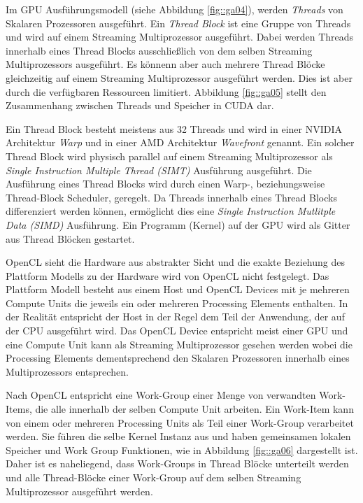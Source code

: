 Im GPU Ausführungsmodell (siehe Abbildung \ref{fig::ga04}), werden \emph{Threads} von Skalaren Prozessoren ausgeführt.
Ein \emph{Thread Block} ist eine Gruppe von Threads und wird auf einem Streaming Multiprozessor ausgeführt.
Dabei werden Threads innerhalb eines Thread Blocks ausschließlich von dem selben Streaming Multiprozessors ausgeführt.
Es könnenn aber auch mehrere Thread Blöcke gleichzeitig auf einem Streaming Multiprozessor ausgeführt werden.
Dies ist aber durch die verfügbaren Ressourcen limitiert.
Abbildung \ref{fig::ga05} stellt den Zusammenhang zwischen Threads und Speicher in CUDA dar.

Ein Thread Block besteht meistens aus 32 Threads und wird in einer NVIDIA Architektur \emph{Warp} und in einer AMD Architektur \emph{Wavefront} genannt.
Ein solcher Thread Block wird physisch parallel auf einem Streaming Multiprozessor als \emph{Single Instruction Multiple Thread (SIMT)} Ausführung ausgeführt.
Die Ausführung eines Thread Blocks wird durch einen Warp-, beziehungsweise Thread-Block Scheduler, geregelt.
Da Threads innerhalb eines Thread Blocks differenziert werden können, ermöglicht dies eine \emph{Single Instruction Mutlitple Data (SIMD)} Ausführung.
Ein Programm (Kernel) auf der GPU wird als Gitter aus Thread Blöcken gestartet.

OpenCL sieht die Hardware aus abstrakter Sicht und die exakte Beziehung des Plattform Modells zu der Hardware wird von OpenCL nicht festgelegt.
Das Plattform Modell besteht aus einem Host und OpenCL Devices mit je mehreren Compute Units die jeweils ein oder mehreren Processing Elements enthalten.
In der Realität entspricht der Host in der Regel dem Teil der Anwendung, der auf der CPU ausgeführt wird.
Das OpenCL Device entspricht meist einer GPU und eine Compute Unit kann als Streaming Multiprozessor gesehen werden wobei die Processing Elements dementsprechend den Skalaren Prozessoren innerhalb eines Multiprozessors entsprechen.

Nach OpenCL entspricht eine Work-Group einer Menge von verwandten Work-Items, die alle innerhalb der selben Compute Unit arbeiten.
Ein Work-Item kann von einem oder mehreren Processing Units als Teil einer Work-Group verarbeitet werden.
Sie führen die selbe Kernel Instanz aus und haben gemeinsamen lokalen Speicher und Work Group Funktionen, wie in Abbildung \ref{fig::ga06} dargestellt ist.
Daher ist es naheliegend, dass Work-Groups in Thread Blöcke unterteilt werden und alle Thread-Blöcke einer Work-Group auf dem selben Streaming Multiprozessor ausgeführt werden.

